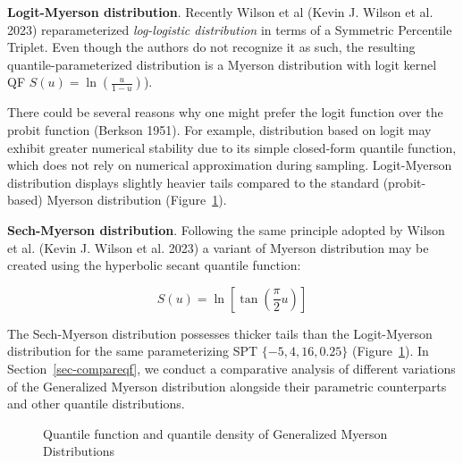 \documentclass[
]{interact}
\begin{document}
\textbf{Logit-Myerson distribution}. Recently Wilson et al (Kevin J.
Wilson et al. 2023) reparameterized \emph{log-logistic distribution} in
terms of a Symmetric Percentile Triplet. Even though the authors do not
recognize it as such, the resulting quantile-parameterized distribution
is a Myerson distribution with logit kernel QF
\(S(u)=\ln\left(\frac{u}{1-u}\right)\)).

There could be several reasons why one might prefer the logit function
over the probit function (Berkson 1951). For example, distribution based
on logit may exhibit greater numerical stability due to its simple
closed-form quantile function, which does not rely on numerical
approximation during sampling. Logit-Myerson distribution displays
slightly heavier tails compared to the standard (probit-based) Myerson
distribution (Figure~\ref{fig-gmyerson-qfdqf-plot1}).

\textbf{Sech-Myerson distribution}. Following the same principle adopted
by Wilson et al. (Kevin J. Wilson et al. 2023) a variant of Myerson
distribution may be created using the hyperbolic secant quantile
function:

\[
S(u)=\ln\left[\tan\left(\frac{\pi}{2}u\right)\right]
\]

The Sech-Myerson distribution possesses thicker tails than the
Logit-Myerson distribution for the same parameterizing SPT
\(\{-5,4,16, 0.25\}\) (Figure~\ref{fig-gmyerson-qfdqf-plot1}). In
Section~\ref{sec-compareqf}, we conduct a comparative analysis of
different variations of the Generalized Myerson distribution alongside
their parametric counterparts and other quantile distributions.

\begin{figure}


\caption{\label{fig-gmyerson-qfdqf-plot1}Quantile function and quantile
density of Generalized Myerson Distributions}

\end{figure}%
\end{document}
